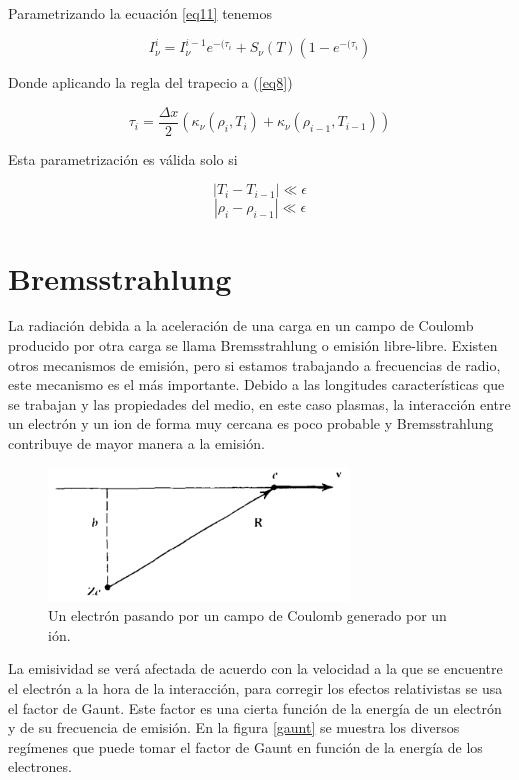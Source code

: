\documentclass[a4paper]{article}
\begin{document}
Parametrizando la ecuación \ref{eq11} tenemos

\begin{equation} \label{eq12}
I_{\nu}^{i} = I_{\nu}^{i-1} e^{-(\tau_{i}} +  S_{\nu}(T)(1- e^{-(\tau_{i}} )
\end{equation}

Donde aplicando la regla del trapecio a (\ref{eq8})

\begin{equation}\label{eq13}
\tau_{i} = \frac{\Delta x}{2} \left(\kappa_{\nu}(\rho_i, T_i) + \kappa_{\nu}(\rho_{i-1}, T_{i-1})\right)     
\end{equation}

Esta parametrización es válida solo si 

$$ \left\vert T_i - T_{i-1} \right\vert \ll \epsilon$$
$$ \left\vert \rho_i - \rho_{i-1} \right\vert \ll \epsilon$$


\newpage
\section{Bremsstrahlung}

La radiación debida a la aceleración de una carga en un campo de Coulomb producido por otra carga se llama Bremsstrahlung o emisión libre-libre. Existen otros mecanismos de emisión, pero si estamos trabajando a frecuencias de radio, este mecanismo es el más importante. Debido a las longitudes características que se trabajan y las propiedades del medio, en este caso plasmas, la interacción entre un electrón y un ion de forma muy cercana es poco probable y Bremsstrahlung contribuye de mayor manera a la emisión. 

\begin{figure}[!htbp]
\begin{center}
\includegraphics[width=8cm]{brem.png}
\end{center}
\caption{Un electrón pasando por un campo de Coulomb generado por un ión.}\label{bremm}
\end{figure}

La emisividad se verá afectada de acuerdo con la velocidad a la que se encuentre el electrón a la hora de la interacción, para corregir los efectos relativistas se usa el factor de Gaunt. Este factor es una cierta función de la energía de un electrón y de su frecuencia de emisión. En la figura \ref{gaunt} se muestra los diversos regímenes que puede tomar el factor de Gaunt en función de la energía de los electrones.
\end{document}
